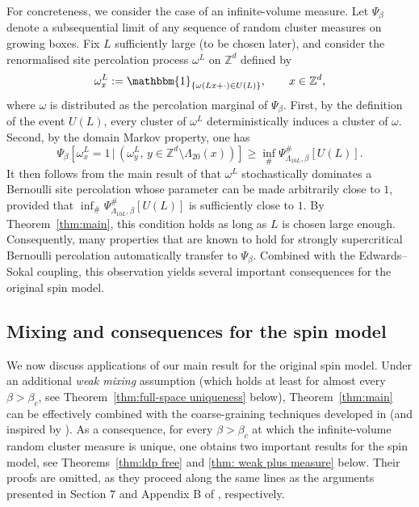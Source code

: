 \documentclass[11pt,a4paper]{article}
\numberwithin{equation}{section}
\theoremstyle{plain}
\theoremstyle{definition}
\begin{document}
For concreteness, we consider the case of an 
infinite-volume measure. Let $\Psi_\beta$ denote a subsequential limit of any sequence of random cluster measures on growing boxes. 
Fix $L$ sufficiently large (to be chosen later), and consider the renormalised site percolation process $\omega^L$ on $\mathbb{Z}^d$ defined by
\begin{equation*}
	\omega^L_x := \mathbbm{1}_{\{\omega(Lx+\cdot)\in U(L)\}}, ~~~~~~ x\in  \mathbb{Z}^d,
\end{equation*}
where $\omega$ is distributed as the percolation marginal of $\Psi_\beta$. 
First, by the definition of the event $U(L)$, every cluster of $\omega^L$ deterministically induces a cluster of $\omega$.
Second, by the domain Markov property, one has 
\begin{equation*}
	\Psi_\beta[\omega^L_{x}=1 \,|\, ( \omega^L_{y}, \, y\in \mathbb{Z}^d \setminus \Lambda_{20}(x) )]\geq  \inf_{\#}\Psi^{\#}_{\Lambda_{10L},\beta}[U(L)].
\end{equation*}
It then follows from the main result of \cite{LSS97} that $\omega^L$ stochastically dominates a Bernoulli site percolation whose parameter can be made arbitrarily close to $1$, provided that $\inf_{\#}\Psi^{\#}_{\Lambda_{10L},\beta}[U(L)]$
is sufficiently close to $1$. By Theorem~\ref{thm:main}, this condition holds as long as $L$ is chosen large enough.
Consequently, many properties that are known to hold for strongly supercritical Bernoulli percolation automatically transfer to $\Psi_\beta$. Combined with the Edwards--Sokal coupling, this observation yields several important consequences for the original spin model.



\subsection{Mixing and consequences for the spin model}

We now discuss applications of our main result for the original spin model. Under an additional \emph{weak mixing} assumption (which holds at least for almost every $\beta>\beta_c$, see Theorem~\ref{thm:full-space uniqueness} below), Theorem~\ref{thm:main} can be effectively combined with the coarse-graining techniques developed in \cite{gunaratnam2025supercritical} (and inspired by \cite{Pisztora96surface}). As a consequence, for every $\beta>\beta_c$ at which the infinite-volume random cluster measure is unique, one obtains two important results for the spin model, see Theorems~\ref{thm:ldp free} and \ref{thm: weak plus measure} below. Their proofs are omitted, as they proceed along the same lines as the arguments presented in Section 7 and Appendix B of \cite{gunaratnam2025supercritical}, respectively.
\end{document}
